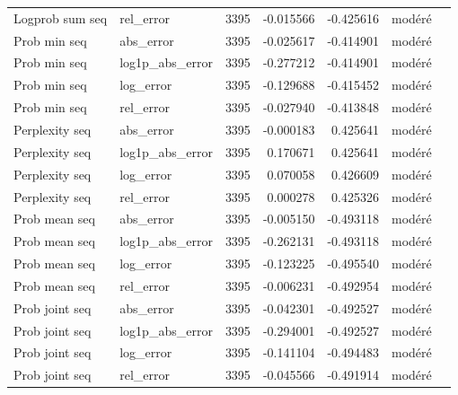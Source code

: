 \begin{longtable}{p{4.0cm}p{2.5cm}rrrll}
Logprob sum seq & rel\_error & 3395 & -0.015566 & -0.425616 & modéré \\
Prob min seq & abs\_error & 3395 & -0.025617 & -0.414901 & modéré \\
Prob min seq & log1p\_abs\_error & 3395 & -0.277212 & -0.414901 & modéré \\
Prob min seq & log\_error & 3395 & -0.129688 & -0.415452 & modéré \\
Prob min seq & rel\_error & 3395 & -0.027940 & -0.413848 & modéré \\
Perplexity seq & abs\_error & 3395 & -0.000183 & 0.425641 & modéré \\
Perplexity seq & log1p\_abs\_error & 3395 & 0.170671 & 0.425641 & modéré \\
Perplexity seq & log\_error & 3395 & 0.070058 & 0.426609 & modéré \\
Perplexity seq & rel\_error & 3395 & 0.000278 & 0.425326 & modéré \\
Prob mean seq & abs\_error & 3395 & -0.005150 & -0.493118 & modéré \\
Prob mean seq & log1p\_abs\_error & 3395 & -0.262131 & -0.493118 & modéré \\
Prob mean seq & log\_error & 3395 & -0.123225 & -0.495540 & modéré \\
Prob mean seq & rel\_error & 3395 & -0.006231 & -0.492954 & modéré \\
Prob joint seq & abs\_error & 3395 & -0.042301 & -0.492527 & modéré \\
Prob joint seq & log1p\_abs\_error & 3395 & -0.294001 & -0.492527 & modéré \\
Prob joint seq & log\_error & 3395 & -0.141104 & -0.494483 & modéré \\
Prob joint seq & rel\_error & 3395 & -0.045566 & -0.491914 & modéré \\
\end{longtable}
